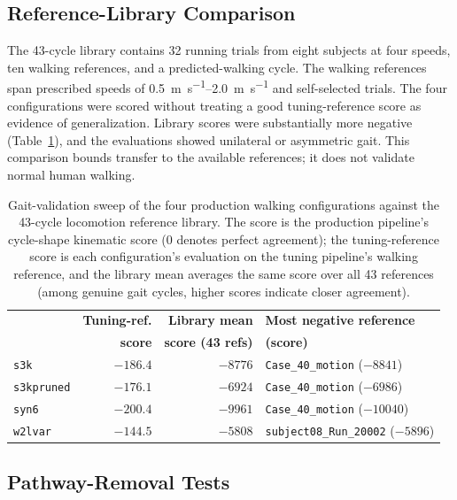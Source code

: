\subsection{Reference-Library Comparison}\label{sec:gait_library_results}

The 43-cycle library contains 32 running trials from eight subjects at four speeds, ten walking references, and a predicted-walking cycle. The walking references span prescribed speeds of \qtyrange{0.5}{2.0}{\meter\per\second} and self-selected trials. The four configurations were scored without treating a good tuning-reference score as evidence of generalization. Library scores were substantially more negative (Table~\ref{tab:gait_sweep}), and the evaluations showed unilateral or asymmetric gait. This comparison bounds transfer to the available references; it does not validate normal human walking.

\begin{table}[htbp]
\caption{Gait-validation sweep of the four production walking configurations against the 43-cycle locomotion reference library. The score is the production pipeline's cycle-shape kinematic score (0 denotes perfect agreement); the tuning-reference score is each configuration's evaluation on the tuning pipeline's walking reference, and the library mean averages the same score over all 43 references (among genuine gait cycles, higher scores indicate closer agreement).}
\label{tab:gait_sweep}
\begin{tabular}{@{}lrrl@{}}
\toprule
 & \textbf{Tuning-ref.} & \textbf{Library mean} & \textbf{Most negative reference} \\
 & \textbf{score} & \textbf{score (43 refs)} & \textbf{(score)} \\
\midrule
\texttt{s3k}        & $-186.4$ & $-8776$ & \texttt{Case\_40\_motion} ($-8841$) \\
\texttt{s3kpruned}  & $-176.1$ & $-6924$ & \texttt{Case\_40\_motion} ($-6986$) \\
\texttt{syn6}       & $-200.4$ & $-9961$ & \texttt{Case\_40\_motion} ($-10040$) \\
\texttt{w2lvar}     & $-144.5$ & $-5808$ & \texttt{subject08\_Run\_20002} ($-5896$) \\
\bottomrule
\end{tabular}
\end{table}

\subsection{Pathway-Removal Tests}\label{sec:walker_variant_results}


